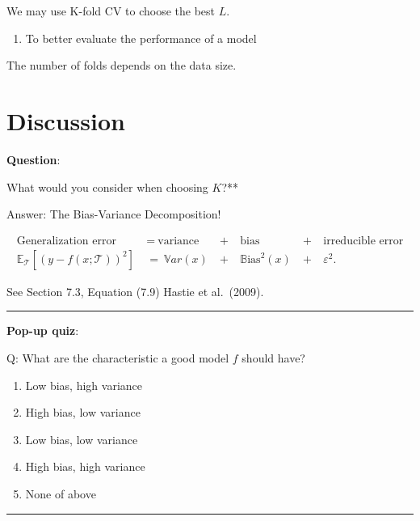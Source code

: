 \documentclass[
  letterpaper,
  DIV=11,
  numbers=noendperiod]{scrreprt}
\providecommand{\tightlist}{%
  \setlength{\itemsep}{0pt}\setlength{\parskip}{0pt}}
\begin{document}
We may use K-fold CV to choose the best \(L\).

\begin{enumerate}
\def\labelenumi{\arabic{enumi}.}
\setcounter{enumi}{1}
\tightlist
\item
  To better evaluate the performance of a model
\end{enumerate}

The number of folds depends on the data size.

\section{Discussion}\label{discussion}

\textbf{Question}:

What would you consider when choosing \(K\)?**

Answer: The Bias-Variance Decomposition!

\begin{align*}
\text{Generalization error} &~=~ \text{variance} &~+~& \text{bias} &~+~& \text{irreducible error} \\
\mathbb{E}_\mathcal{T}[(y-f(x;\mathcal{T}))^2] &~=~ \mathbb{V}ar(x) &~+~& \mathbb{B}\mathrm{ias}^2(x) &~+~& \varepsilon^2.
\end{align*}

See Section 7.3, Equation (7.9) Hastie et al.~(2009).

\begin{center}\rule{0.5\linewidth}{0.5pt}\end{center}

\textbf{Pop-up quiz}:

Q: What are the characteristic a good model \(f\) should have?

\begin{enumerate}
\def\labelenumi{\arabic{enumi}.}
\item
  Low bias, high variance
\item
  High bias, low variance
\item
  Low bias, low variance
\item
  High bias, high variance
\item
  None of above
\end{enumerate}

\begin{center}\rule{0.5\linewidth}{0.5pt}\end{center}
\end{document}

